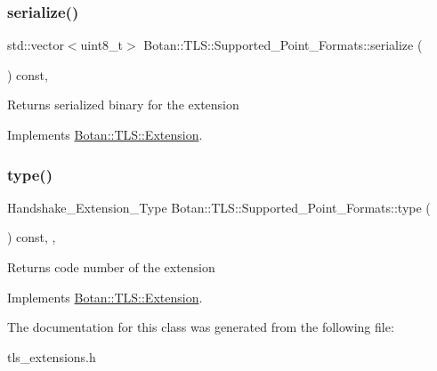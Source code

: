 \mbox{\label{class_botan_1_1_t_l_s_1_1_supported___point___formats_aa54041e3a08a83be4aeffa4b105a282c}} 
\subsubsection{\texorpdfstring{serialize()}{serialize()}}
{\footnotesize\ttfamily std\+::vector$<$uint8\+\_\+t$>$ Botan\+::\+T\+L\+S\+::\+Supported\+\_\+\+Point\+\_\+\+Formats\+::serialize (\begin{DoxyParamCaption}{ }\end{DoxyParamCaption}) const\hspace{0.3cm}{\ttfamily [override]}, {\ttfamily [virtual]}}

\begin{DoxyReturn}{Returns}
serialized binary for the extension 
\end{DoxyReturn}


Implements \hyperlink{class_botan_1_1_t_l_s_1_1_extension_a56788726ad2526db54e5a26039cb69db}{Botan\+::\+T\+L\+S\+::\+Extension}.

\mbox{\label{class_botan_1_1_t_l_s_1_1_supported___point___formats_aeaf44021244451a57f6c257f13aa0a7d}} 
\subsubsection{\texorpdfstring{type()}{type()}}
{\footnotesize\ttfamily Handshake\+\_\+\+Extension\+\_\+\+Type Botan\+::\+T\+L\+S\+::\+Supported\+\_\+\+Point\+\_\+\+Formats\+::type (\begin{DoxyParamCaption}{ }\end{DoxyParamCaption}) const\hspace{0.3cm}{\ttfamily [inline]}, {\ttfamily [override]}, {\ttfamily [virtual]}}

\begin{DoxyReturn}{Returns}
code number of the extension 
\end{DoxyReturn}


Implements \hyperlink{class_botan_1_1_t_l_s_1_1_extension_ac8819b312ce604453225e7b4f7c373ec}{Botan\+::\+T\+L\+S\+::\+Extension}.



The documentation for this class was generated from the following file\+:\begin{DoxyCompactItemize}
\item 
tls\+\_\+extensions.\+h\end{DoxyCompactItemize}
